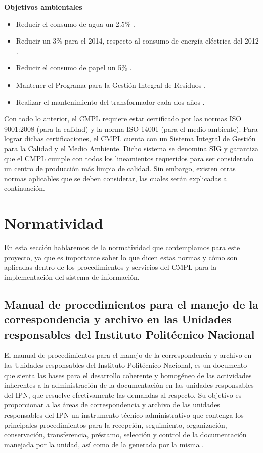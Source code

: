\textbf{Objetivos ambientales}

\begin{itemize}
	\item Reducir el consumo de agua un 2.5\% \cite{PoliticaCMPL}.
	\item Reducir un 3\% para el 2014, respecto al consumo de energía eléctrica del 2012 \cite{PoliticaCMPL}.
	\item Reducir el consumo de papel un 5\% \cite{PoliticaCMPL}.
	\item Mantener el Programa para la Gestión Integral de Residuos \cite{PoliticaCMPL}.
	\item Realizar el mantenimiento del transformador cada dos años \cite{PoliticaCMPL}.
\end{itemize}

	Con todo lo anterior, el CMPL requiere estar certificado por las normas ISO 9001:2008 (para la calidad) y la norma ISO 14001 (para el medio ambiente). Para lograr dichas certificaciones, el CMPL cuenta con un Sistema Integral de Gestión para la Calidad y el Medio Ambiente. Dicho sistema se denomina SIG y garantiza que el CMPL cumple con todos los lineamientos requeridos para ser considerado un centro de producción más limpia de calidad. Sin embargo, existen otras normas aplicables que se deben considerar, las cuales serán explicadas a continuación.
	
\section{Normatividad}
	En esta sección hablaremos de la normatividad que contemplamos para este proyecto, ya que es importante saber lo que dicen estas normas y cómo son aplicadas dentro de los procedimientos y servicios del CMPL para la implementación del sistema de información.\\
	
	\subsection{Manual de procedimientos para el manejo de la correspondencia y archivo en las Unidades responsables del Instituto Politécnico Nacional}
	
	El manual de procedimientos para el manejo de la correspondencia y archivo en las Unidades responsables del Instituto Politécnico Nacional, es un documento que sienta las bases para el desarrollo coherente y homogéneo de las actividades inherentes a la administración de la documentación en las unidades responsables del IPN, que resuelve efectivamente las demandas al respecto. Su objetivo es proporcionar a las áreas de correspondencia y archivo de las unidades responsables del IPN un instrumento técnico administrativo que contenga los principales procedimientos para la recepción, seguimiento, organización, conservación,
transferencia, préstamo, selección y control de la documentación manejada por la unidad, así como de la generada por la misma \cite{ManProcyArcIPN}.\\
	
